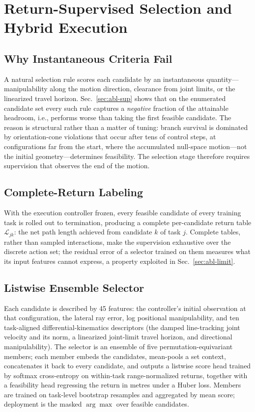 \documentclass[journal]{IEEEtran}
\begin{document}
\section{Return-Supervised Selection and Hybrid Execution}
\label{sec:selection}

\subsection{Why Instantaneous Criteria Fail}
A natural selection rule scores each candidate by an instantaneous
quantity---manipulability along the motion direction, clearance from
joint limits, or the linearized travel horizon. Sec.~\ref{sec:abl-sup}
shows that on the enumerated candidate set every such rule captures a
\textit{negative} fraction of the attainable headroom, i.e., performs
worse than taking the first feasible candidate. The reason is structural
rather than a matter of tuning: branch survival is dominated by
orientation-cone violations that occur after tens of control steps, at
configurations far from the start, where the accumulated null-space
motion---not the initial geometry---determines feasibility. The
selection stage therefore requires supervision that observes the end of
the motion.

\subsection{Complete-Return Labeling}
With the execution controller frozen, every feasible candidate of every
training task is rolled out to termination, producing a complete
per-candidate return table $\mathcal{L}_{jk}$: the net path length
achieved from candidate $k$ of task $j$. Complete tables, rather than
sampled interactions, make the supervision exhaustive over the discrete
action set; the residual error of a selector trained on them measures
what its input features cannot express, a property exploited in
Sec.~\ref{sec:abl-limit}.

\subsection{Listwise Ensemble Selector}
Each candidate is described by 45 features: the controller's initial
observation at that configuration, the lateral ray error, log positional
manipulability, and ten task-aligned differential-kinematics descriptors
(the damped line-tracking joint velocity and its norm, a linearized
joint-limit travel horizon, and directional manipulability). The
selector is an ensemble of five permutation-equivariant members; each
member embeds the candidates, mean-pools a set context, concatenates it
back to every candidate, and outputs a listwise score head trained by
softmax cross-entropy on within-task range-normalized returns, together
with a feasibility head regressing the return in metres under a Huber
loss. Members are trained on task-level bootstrap resamples and
aggregated by mean score; deployment is the masked $\arg\max$ over
feasible candidates.
\end{document}

